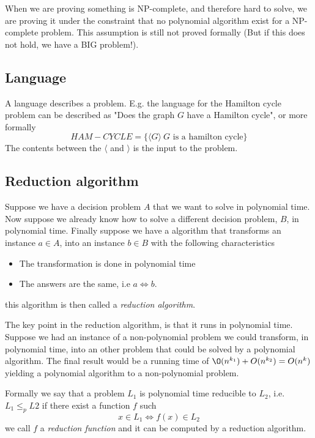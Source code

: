 \documentclass[10pt]{article}
\begin{document}
When we are proving something is NP-complete, and therefore hard to solve, we are proving it under the constraint that no polynomial algorithm exist for a NP-complete problem. This assumption is still not proved formally (But if this does not hold, we have a BIG problem!).


\subsection{Language} %
\label{sub:language}
A language describes a problem. E.g. the language for the Hamilton cycle problem can be described as "Does the graph $G$ have a Hamilton cycle", or more formally
\begin{equation}
HAM-CYCLE = \{\langle G \rangle\: G \text{ is a hamilton cycle}\}   
\end{equation}
The contents between the $\langle$ and $\rangle$ is the input to the problem.

\subsection{Reduction algorithm} %
\label{sub:reduction_algorithm}
Suppose we have a decision problem $A$ that we want to solve in polynomial time. Now suppose we already know how to solve a different decision problem, $B$, in polynomial time. Finally suppose we have a algorithm that transforms an instance $a \in A$, into an instance $b \in B$ with the following characteristics
\begin{itemize}
  \item The transformation is done in polynomial time
  \item The answers are the same, i.e $a \Leftrightarrow b$.
\end{itemize}
this algorithm is then called a \emph{reduction algorithm}. 

The key point in the reduction algorithm, is that it runs in polynomial time. Suppose we had an instance of a non-polynomial problem we could transform, in polynomial time, into an other problem that could be solved by a polynomial algorithm. The final result would be a running time of $\O(n^{k_1})+O(n^{k_2}) = O(n^k)$ yielding a polynomial algorithm to a non-polynomial problem.

Formally we say that a problem $L_1$ is polynomial time reducible to $L_2$, i.e. $L_1 \leq_p L2$ if there exist a function $f$ such
\begin{equation}
  x \in L_1 \Leftrightarrow f(x) \in L_2 \label{eq15}
\end{equation}
we call $f$ a \emph{reduction function} and it can be computed by a reduction algorithm.
\end{document}
